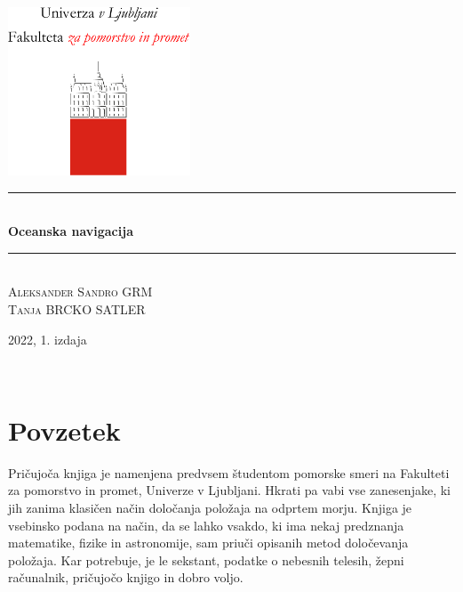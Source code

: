 \documentclass[10pt,twosided]{book}
\theoremstyle{definition}
\begin{document}
\pagestyle{empty}

    \begin{center}
	    \includegraphics[height=5cm]{fpp_logo_vertical_slo_red.pdf}\\[3cm]
	    
		\rule{\linewidth}{1 mm} \\[7mm]
		{ \huge \bfseries Oceanska navigacija}\\[4mm]
		\rule{\linewidth}{1 mm} \\[3cm]
		
		{\large \textsc{Aleksander Sandro GRM} }\\[2mm]
		{\large \textsc{Tanja BRCKO SATLER} }
		
		\vspace{3cm}
		2022, 1. izdaja
		
	\end{center}

\clearpage
~
\newpage
\pagestyle{plain}
\setcounter{page}{1}

\tableofcontents

\newpage
\chapter*{Povzetek}

Pričujoča knjiga je namenjena predvsem študentom pomorske smeri na Fakulteti za pomorstvo in promet, Univerze v Ljubljani. Hkrati pa vabi vse zanesenjake, ki jih zanima klasičen način določanja položaja na odprtem morju. Knjiga je vsebinsko podana na način, da se lahko vsakdo, ki ima nekaj predznanja matematike, fizike in astronomije, sam priuči opisanih metod določevanja položaja. Kar potrebuje, je le sekstant, podatke o nebesnih telesih, žepni računalnik, pričujočo knjigo in dobro voljo.
\end{document}
